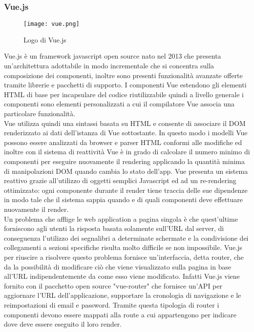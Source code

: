 \subsubsection{Vue.js}
\begin{figure}[H]
	\begin{center}
		\texttt{[image: vue.png]}
		\caption{Logo di Vue.js}
	\end{center}
\end{figure}
Vue.js è un framework javascript open source nato nel 2013 che presenta un'architettura adottabile in modo incrementale che si concentra sulla composizione dei componenti, inoltre sono presenti funzionalità avanzate offerte tramite librerie e pacchetti di supporto. I componenti Vue estendono gli elementi HTML di base per incapsulare del codice riutilizzabile quindi a livello generale i componenti sono elementi personalizzati a cui il compilatore Vue associa una particolare funzionalità.\\
Vue utilizza quindi una sintassi basata su HTML e consente di associare il DOM renderizzato ai dati dell'istanza di Vue sottostante. In questo modo i modelli Vue possono essere analizzati da browser e parser HTML conformi alle modifiche ed inoltre con il sistema di reattività Vue è in grado di calcolare il numero minimo di componenti per eseguire nuovamente il rendering applicando la quantità minima di manipolazioni DOM quando cambia lo stato dell'app. Vue presenta un sistema reattivo grazie all'utilizzo di oggetti semplici Javascript ed ad un re-rendering ottimizzato: ogni componente durante il render tiene traccia delle sue dipendenze in modo tale che il sistema sappia quando e di quali componenti deve effettuare nuovamente il render.\\
Un problema che afflige le web application a pagina singola è che quest'ultime forniscono agli utenti la risposta basata solamente sull'URL dal server, di conseguenza l'utilizzo dei segnalibri a determinate schermate e la condivisione dei collegamenti a sezioni specifiche risulta molto difficile se non impossibile. Vue.js per riuscire a risolvere questo problema fornisce un'interfaccia, detta router, che da la possibilità di modificare ciò che viene visualizzato sulla pagina in base all'URL indipendentemente da come esso viene modificato. Infatti Vue.js viene fornito con il pacchetto open source "vue-router" che fornisce un'API per aggiornare l'URL dell'applicazione, supportare la cronologia di navigazione e le reimpostazioni di email e password. Tramite questa tipologia di router i componenti devono essere mappati alla route a cui appartengono per indicare dove deve essere eseguito il loro render.\\
